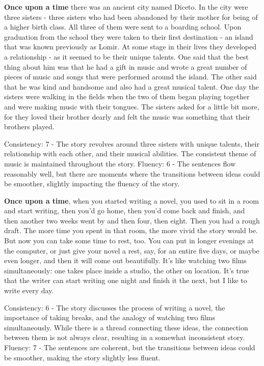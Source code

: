 \documentclass{article}
\begin{document}
\textbf{Once upon a time} there was an ancient city named Diceto. In the city were three sisters - three sisters who had been abandoned by their mother for being of a higher birth class. All three of them were sent to a boarding school. Upon graduation from the school they were taken to their first destination - an island that was known previously as Lomir. At some stage in their lives they developed a relationship - as it seemed to be their unique talents. One said that the best thing about him was that he had a gift in music and wrote a great number of pieces of music and songs that were performed around the island. The other said that he was kind and handsome and also had a great musical talent. One day the sisters were walking in the fields when the two of them began playing together and were making music with their tongues. The sisters asked for a little bit more, for they loved their brother dearly and felt the music was something that their brothers played.

Consistency: 7 - The story revolves around three sisters with unique talents, their relationship with each other, and their musical abilities. The consistent theme of music is maintained throughout the story.
Fluency: 6 - The sentences flow reasonably well, but there are moments where the transitions between ideas could be smoother, slightly impacting the fluency of the story.

\textbf{Once upon a time}, when you started writing a novel, you used to sit in a room and start writing, then you'd go home, then you'd come back and finish, and then another two weeks went by and then four, then eight. Then you had a rough draft. The more time you spent in that room, the more vivid the story would be. But now you can take some time to rest, too. You can put in longer evenings at the computer, or just give your novel a rest, say, for an entire five days, or maybe even longer, and then it will come out beautifully. It's like watching two films simultaneously: one takes place inside a studio, the other on location. It's true that the writer can start writing one night and finish it the next, but I like to write every day.

Consistency: 6 - The story discusses the process of writing a novel, the importance of taking breaks, and the analogy of watching two films simultaneously. While there is a thread connecting these ideas, the connection between them is not always clear, resulting in a somewhat inconsistent story.
Fluency: 7 - The sentences are coherent, but the transitions between ideas could be smoother, making the story slightly less fluent.
\end{document}
